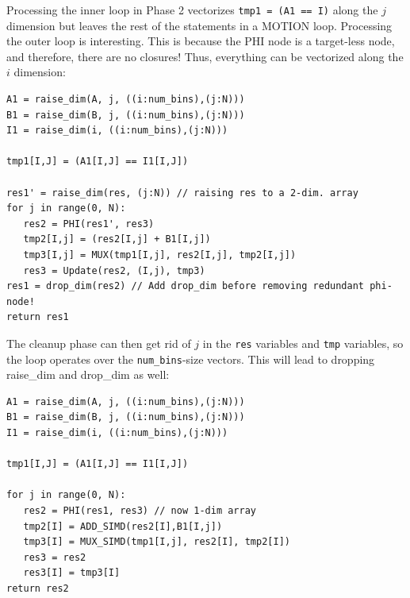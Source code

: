 \documentclass[sigconf, screen, natbib=false, dvipsnames, table]{acmart}
\theoremstyle{definition}
\begin{document}
Processing the inner loop in Phase 2 vectorizes \texttt{tmp1 = (A1 == I)} along the $j$ dimension but leaves the rest of the statements in a MOTION loop. Processing the outer loop is interesting. This is because the PHI node is a target-less node, and therefore, there are no closures! Thus, everything can be vectorized along the $i$ dimension:

{\small
\begin{verbatim}
A1 = raise_dim(A, j, ((i:num_bins),(j:N)))
B1 = raise_dim(B, j, ((i:num_bins),(j:N)))
I1 = raise_dim(i, ((i:num_bins),(j:N)))

tmp1[I,J] = (A1[I,J] == I1[I,J])

res1' = raise_dim(res, (j:N)) // raising res to a 2-dim. array
for j in range(0, N):
   res2 = PHI(res1', res3)
   tmp2[I,j] = (res2[I,j] + B1[I,j])
   tmp3[I,j] = MUX(tmp1[I,j], res2[I,j], tmp2[I,j])
   res3 = Update(res2, (I,j), tmp3)
res1 = drop_dim(res2) // Add drop_dim before removing redundant phi-node!      
return res1
\end{verbatim}
}

The cleanup phase can then get rid of $j$ in the \texttt{res} variables and \texttt{tmp} variables, so the loop operates over the \texttt{num\_bins}-size vectors. 
This will lead to dropping raise\_dim and drop\_dim as well: 

{\small
\begin{verbatim}
A1 = raise_dim(A, j, ((i:num_bins),(j:N)))
B1 = raise_dim(B, j, ((i:num_bins),(j:N)))
I1 = raise_dim(i, ((i:num_bins),(j:N)))

tmp1[I,J] = (A1[I,J] == I1[I,J])

for j in range(0, N):
   res2 = PHI(res1, res3) // now 1-dim array
   tmp2[I] = ADD_SIMD(res2[I],B1[I,j])
   tmp3[I] = MUX_SIMD(tmp1[I,j], res2[I], tmp2[I])
   res3 = res2
   res3[I] = tmp3[I]
return res2
\end{verbatim}
}
\end{document}
